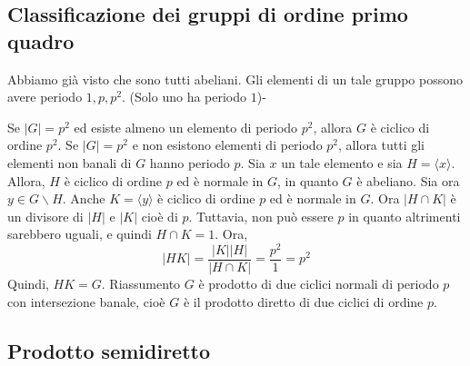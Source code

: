 \documentclass[a4paper]{article}
\begin{document}





\subsection{Classificazione dei gruppi di ordine primo quadro}

Abbiamo già visto che sono tutti abeliani.
Gli elementi di un tale gruppo possono avere periodo \(1, p, p^2\). (Solo uno ha periodo \(1\))-

Se \(|G| = p^2\) ed esiste almeno un elemento di periodo
\(p^2\), allora \(G\) è ciclico di ordine \(p^2\).
Se \(|G| = p^2\) e non esistono elementi di periodo \(p^2\),
allora tutti gli elementi non banali di \(G\) hanno periodo \(p\).
Sia \(x\) un tale elemento e sia \(H = \langle x \rangle\).
Allora, \(H\) è ciclico di ordine \(p\) ed è normale in \(G\), in quanto \(G\) è abeliano.
Sia ora \(y \in G \backslash H\). Anche \(K = \langle y \rangle\)
è ciclico di ordine \(p\) ed è normale in \(G\).
Ora \(|H \cap K|\) è un divisore di \(|H|\) e \(|K|\)
cioè di \(p\). Tuttavia, non può essere \(p\) in quanto altrimenti sarebbero uguali,
e quindi \(H \cap K = 1\).
Ora,
\[
    |HK| = \frac{|K||H|}{|H \cap K|} = \frac{p^2}{1} = p^2
\]
Quindi, \(HK = G\).
Riassumento \(G\) è prodotto di due ciclici normali
di periodo \(p\) con intersezione banale,
cioè \(G\) è il prodotto diretto di due ciclici di ordine \(p\).

\subsection{Prodotto semidiretto}
\end{document}
